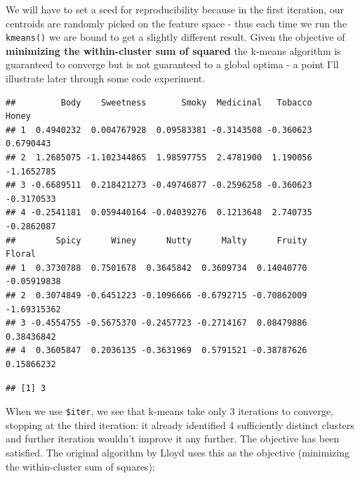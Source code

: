 \documentclass[]{article}
\newenvironment{Shaded}{\begin{snugshade}}{\end{snugshade}}
\newcommand{\CommentTok}[1]{\textcolor[rgb]{0.56,0.35,0.01}{\textit{#1}}}
\newcommand{\DecValTok}[1]{\textcolor[rgb]{0.00,0.00,0.81}{#1}}
\newcommand{\KeywordTok}[1]{\textcolor[rgb]{0.13,0.29,0.53}{\textbf{#1}}}
\newcommand{\NormalTok}[1]{#1}
\newcommand{\OperatorTok}[1]{\textcolor[rgb]{0.81,0.36,0.00}{\textbf{#1}}}
\newcommand{\StringTok}[1]{\textcolor[rgb]{0.31,0.60,0.02}{#1}}
\begin{document}
We will have to set a seed for reproducibility because in the first
iteration, our centroids are randomly picked on the feature space - thus
each time we run the \texttt{kmeans()} we are bound to get a slightly
different result. Given the objective of \textbf{minimizing the
within-cluster sum of squared} the k-means algorithm is guaranteed to
converge but is not guaranteed to a global optima - a point I'll
illustrate later through some code experiment.

\begin{Shaded}
\end{Shaded}

\begin{verbatim}
##         Body    Sweetness       Smoky  Medicinal   Tobacco      Honey
## 1  0.4940232  0.004767928  0.09583381 -0.3143508 -0.360623  0.6790443
## 2  1.2685075 -1.102344865  1.98597755  2.4781900  1.190056 -1.1652785
## 3 -0.6689511  0.218421273 -0.49746877 -0.2596258 -0.360623 -0.3170533
## 4 -0.2541181  0.059440164 -0.04039276  0.1213648  2.740735 -0.2862087
##        Spicy      Winey      Nutty      Malty      Fruity      Floral
## 1  0.3730788  0.7501678  0.3645842  0.3609734  0.14040770 -0.05919838
## 2  0.3074849 -0.6451223 -0.1096666 -0.6792715 -0.70862009 -1.69315362
## 3 -0.4554755 -0.5675370 -0.2457723 -0.2714167  0.08479886  0.38436842
## 4  0.3605847  0.2036135 -0.3631969  0.5791521 -0.38787626  0.15866232
\end{verbatim}

\begin{Shaded}
\end{Shaded}

\begin{verbatim}
## [1] 3
\end{verbatim}

When we use \texttt{\$iter}, we see that k-means take only 3 iterations
to converge, stopping at the third iteration: it already identified 4
sufficiently distinct clusters and further iteration wouldn't improve it
any further. The objective has been satisfied. The original algorithm by
Lloyd uses this as the objective (minimizing the within-cluster sum of
squares):
\end{document}
